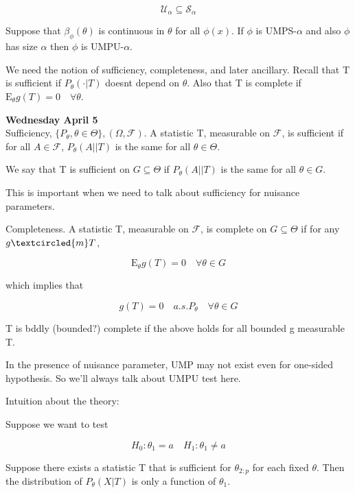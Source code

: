 \documentclass[11pt,fleqn]{book} %
\newcommand{\E}{\mathrm{E}}
\begin{document}
		$$\mathscr{U}_\alpha \subseteq \mathscr{S}_\alpha $$


\begin{theorem}
	Suppose that $\beta_\phi (\theta)$ is continuous in $\theta$ for all $\phi(x)$. If $\phi$ is UMPS-$\alpha$ and also $\phi$ has size $\alpha$ then $\phi$ is UMPU-$\alpha$.
\end{theorem}

We need the notion of sufficiency, completeness, and later ancillary. Recall that T is sufficient if $P_\theta(\cdot| T)$ doesnt depend on $\theta$. Also that T is complete if $\E_\theta g(T) = 0 \quad \forall \theta$. 


\textbf{Wednesday April 5}\\

Sufficiency, $\{P_\theta, \theta \in \Theta \}, (\Omega, \mathcal{F})$. A statistic T, measurable on $\mathcal{F}$, is sufficient if for all $A \in \mathcal{F}$, $P_\theta(A||T)$ is the same for all $\theta \in \Theta$. 

We say that T is sufficient on $G \subseteq \Theta$ if $P_\theta (A||T)$ is the same for all $\theta \in G$. 

This is important when we need to talk about sufficiency for nuisance parameters. 


Completeness. A statistic T, measurable on $\mathcal{F}$, is complete on $G \subseteq \Theta$ if for any $g \textcircled{m} T$, 

		$$\E_\theta g(T) = 0 \quad \forall \theta \in G $$

which implies that

		$$g(T) = 0 \quad a.s. P_\theta \quad \forall \theta \in G $$

T is bddly (bounded?) complete if the above holds for all bounded g measurable T. 


\begin{remark}
	In the presence of nuisance parameter, UMP may not exist even for one-sided hypothesis. So we'll always talk about UMPU test here. 
\end{remark}

Intuition about the theory:

Suppose we want to test 

		$$H_0: \theta_1 = a \quad H_1: \theta_1 \neq a $$

Suppose there exists a statistic T that is sufficient for $\theta_{2:p}$ for each fixed $\theta$. Then the distribution of $P_\theta(X|T)$ is only a function of $\theta_1$. 
\end{document}

